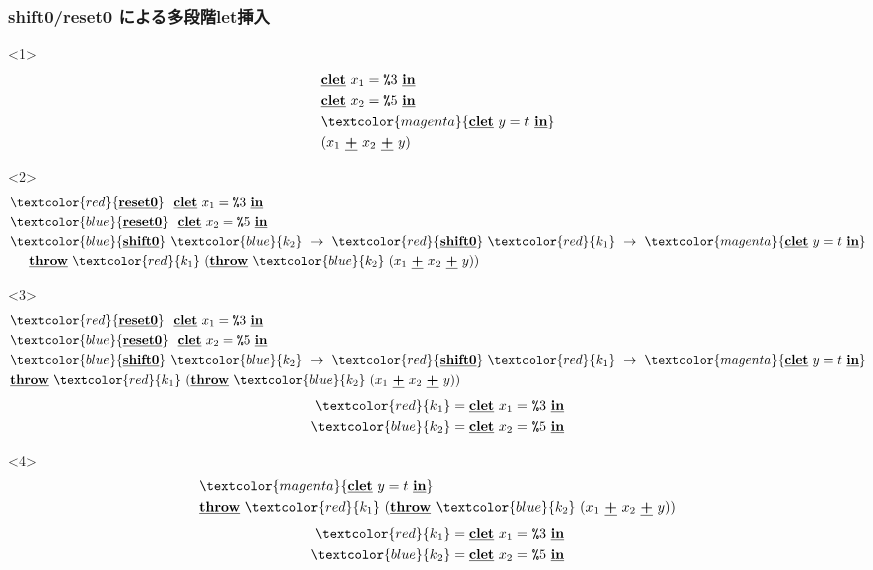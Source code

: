 \documentclass[dvipdfmx,cjk,xcolor=dvipsnames,envcountsect,notheorems,12pt]{beamer}
\newcommand\cResetz{\underline{\textbf{reset0}}}
\newcommand\cShiftz{\underline{\textbf{shift0}}}
\newcommand\cThrow{\underline{\textbf{throw}}}
\newcommand\cPlus{\underline{\textbf{+}}}
\newcommand\cLet{\underline{\textbf{clet}}}
\newcommand\cIn{\underline{\textbf{in}}}
\newcommand\csp[1]{\texttt{\%}{#1}}
\newcommand\red[1]{\textcolor{red}{#1}}
\newcommand\magenta[1]{\textcolor{magenta}{#1}}
\newcommand\blue[1]{\textcolor{blue}{#1}}
\theoremstyle{definition}
\begin{document}
\begin{frame}
  \frametitle{shift0/reset0 による多段階let挿入}
  \begin{onlyenv}<1>
    \begin{align*}
      & \cLet~x_1=\csp{3}~\cIn \\
      & \cLet~x_2=\csp{5}~\cIn \\
      & \magenta{\cLet~y=t~\cIn} \\
      & (x_1~\cPlus~x_2~\cPlus~y)
    \end{align*}
  \end{onlyenv}

  \begin{onlyenv}<2>
    \begin{align*}
      & \red{\cResetz} ~~\cLet~x_1=\csp{3}~\cIn \\
      & \blue{\cResetz} ~~\cLet~x_2=\csp{5}~\cIn \\
      & \blue{\cShiftz}~\blue{k_2}~\to~ \red{\cShiftz}~\red{k_1}~\to~ \magenta{\cLet~y=t~\cIn} \\
      & \phantom{=}~~ \cThrow~\red{k_1}~(\cThrow~\blue{k_2}~(x_1~\cPlus~x_2~\cPlus~y))
    \end{align*}
  \end{onlyenv}

  \begin{onlyenv}<3>
    \begin{align*}
      & \red{\cResetz} ~~\cLet~x_1=\csp{3}~\cIn \\
      & \blue{\cResetz} ~~\cLet~x_2=\csp{5}~\cIn \\
      & \blue{\cShiftz}~\blue{k_2}~\to~ \red{\cShiftz}~\red{k_1}~\to~ \magenta{\cLet~y=t~\cIn} \\
      & \cThrow~\red{k_1}~(\cThrow~\blue{k_2}~(x_1~\cPlus~x_2~\cPlus~y))
    \end{align*}
    \begin{align*}
      \red{k_1} &= \cLet~x_1=\csp{3}~\cIn  \\
      \blue{k_2} &= \cLet~x_2=\csp{5}~\cIn  \\
    \end{align*}
  \end{onlyenv}

  \begin{onlyenv}<4>
    \begin{align*}
      & \magenta{\cLet~y=t~\cIn} \\
      & \cThrow~\red{k_1}~(\cThrow~\blue{k_2}~(x_1~\cPlus~x_2~\cPlus~y))
    \end{align*}
    \begin{align*}
      \red{k_1} &= \cLet~x_1=\csp{3}~\cIn  \\
      \blue{k_2} &= \cLet~x_2=\csp{5}~\cIn  \\
    \end{align*}
  \end{onlyenv}


\end{frame}
\end{document}
